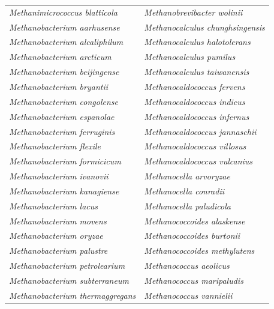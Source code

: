 \documentclass[fontsize=12pt,headsepline=true, bibliography=totocnumbered, twoside]{scrbook} %
\begin{document}
\begin{table}[h]
\small
\begin{tabular}{ll}
\textit{Methanimicrococcus blatticola}   & \textit{Methanobrevibacter wolinii}      \\
\textit{Methanobacterium aarhusense}     & \textit{Methanocalculus chunghsingensis} \\
\textit{Methanobacterium alcaliphilum}   & \textit{Methanocalculus halotolerans}    \\
\textit{Methanobacterium arcticum}       & \textit{Methanocalculus pumilus}         \\
\textit{Methanobacterium beijingense}    & \textit{Methanocalculus taiwanensis}     \\
\textit{Methanobacterium bryantii}       & \textit{Methanocaldococcus fervens}      \\
\textit{Methanobacterium congolense}     & \textit{Methanocaldococcus indicus}      \\
\textit{Methanobacterium espanolae}      & \textit{Methanocaldococcus infernus}     \\
\textit{Methanobacterium ferruginis}     & \textit{Methanocaldococcus jannaschii}   \\
\textit{Methanobacterium flexile}        & \textit{Methanocaldococcus villosus}     \\
\textit{Methanobacterium formicicum}     & \textit{Methanocaldococcus vulcanius}    \\
\textit{Methanobacterium ivanovii}       & \textit{Methanocella arvoryzae}          \\
\textit{Methanobacterium kanagiense}     & \textit{Methanocella conradii}           \\
\textit{Methanobacterium lacus}          & \textit{Methanocella paludicola}         \\
\textit{Methanobacterium movens}         & \textit{Methanococcoides alaskense}      \\
\textit{Methanobacterium oryzae}         & \textit{Methanococcoides burtonii}       \\
\textit{Methanobacterium palustre}       & \textit{Methanococcoides methylutens}    \\
\textit{Methanobacterium petrolearium}   & \textit{Methanococcus aeolicus}          \\
\textit{Methanobacterium subterraneum}   & \textit{Methanococcus maripaludis}       \\
\textit{Methanobacterium thermaggregans} & \textit{Methanococcus vannielii}         \\

\end{tabular}
\end{table}
\end{document}
